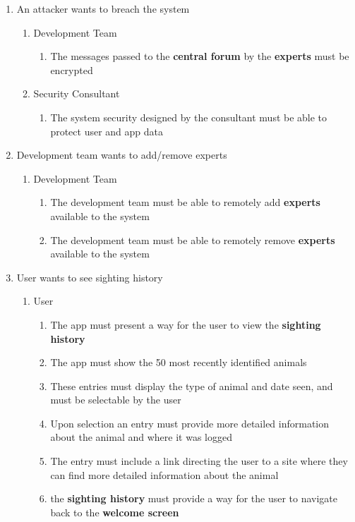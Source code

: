 \documentclass[]{article}
\begin{document}
\begin{enumerate}[{BE}1.]
	\item An attacker wants to breach the system
	\begin{enumerate}[{VP2}.1]
		\item Development Team
			\begin{enumerate}
				\item The messages passed to the \textbf{central forum} by the \textbf{experts} must be encrypted
			\end{enumerate}
		\item Security Consultant
			\begin{enumerate}
					\item The system security designed by the consultant must be able to protect user and app data
			\end{enumerate}
	\end{enumerate}


	\item Development team wants to add/remove experts
	\begin{enumerate}[{VP3}.1]
		\item Development Team
			\begin{enumerate}
				\item The development team must be able to remotely add \textbf{experts} available to the system
				\item The development team must be able to remotely remove \textbf{experts} available to the system
			\end{enumerate}
	\end{enumerate}


	\item User wants to see sighting history
	\begin{enumerate}[{VP4}.1]
		\item User
			\begin{enumerate}
				\item The app must present a way for the user to view the \textbf{sighting history}
				\item The app must show the 50 most recently identified animals
				\item These entries must display the type of animal and date seen, and must be selectable by the user
				\item Upon selection an entry must provide more detailed information about the animal and where it was logged
				\item The entry must include a link directing the user to a site where they can find more detailed information about the animal
				\item the \textbf{sighting history} must provide a way for the user to navigate back to the \textbf{welcome screen}
			\end{enumerate}
	\end{enumerate}



\end{enumerate}
\end{document}
